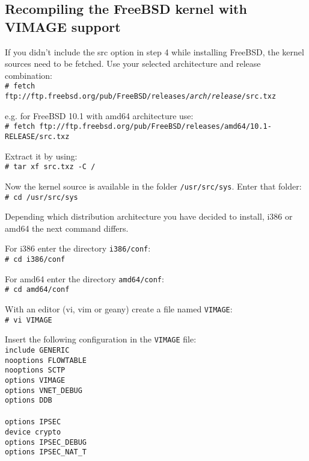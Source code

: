\subsection{Recompiling the FreeBSD kernel with VIMAGE support}

If you didn't include the src option in step 4 while installing FreeBSD, the
kernel sources need to be fetched. Use your selected architecture and release combination:\\
\texttt{\# fetch ftp://ftp.freebsd.org/pub/FreeBSD/releases/\emph{arch}/\emph{release}/src.txz}

e.g. for FreeBSD 10.1 with amd64 architecture use:\\
\texttt{\# fetch ftp://ftp.freebsd.org/pub/FreeBSD/releases/amd64/10.1-RELEASE/src.txz}

Extract it by using:\\
\texttt{\# tar xf src.txz -C /}

Now the kernel source is available in the folder \texttt{/usr/src/sys}. Enter
that folder:\\
\texttt{\# cd /usr/src/sys}

Depending which distribution architecture you have decided to install, i386 or
amd64 the next command differs.

For i386 enter the directory \texttt{i386/conf}:\\
\texttt{\# cd i386/conf}

For amd64 enter the directory \texttt{amd64/conf}:\\
\texttt{\# cd amd64/conf}

With an editor (vi, vim or geany) create a file named \texttt{VIMAGE}:\\
\texttt{\# vi VIMAGE}

Insert the following configuration in the \texttt{VIMAGE} file:\\
\texttt{include	GENERIC \\
nooptions FLOWTABLE \\
nooptions SCTP \\
options VIMAGE \\
options VNET\_DEBUG \\
options DDB \\
 \\
options IPSEC \\
device crypto \\
options IPSEC\_DEBUG \\
options IPSEC\_NAT\_T \\
 \\
}

